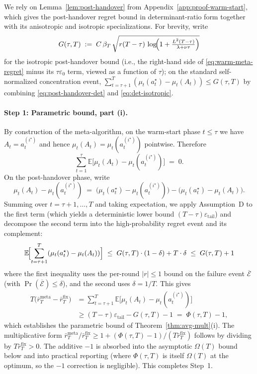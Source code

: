 \documentclass{article}
\theoremstyle{definition}
\theoremstyle{remark}
\newcommand{\meta}{\mathrm{meta}}
\newcommand{\fix}{\mathrm{fix}}
\theoremstyle{remark}
\begin{document}
We rely on Lemma~\ref{lem:post-handover} from
Appendix~\ref{app:proof-warm-start}, which gives the post-handover regret
bound in determinant-ratio form together with its anisotropic and
isotropic specializations. For brevity, write
\[
G(\tau,T)
\;:=\;
C\,\beta_T\,
\sqrt{
r(T-\tau)\,
\log\!\Bigl(1+\tfrac{L^2(T-\tau)}{\lambda+\nu\tau}\Bigr)
}
\]
for the isotropic post-handover bound (i.e., the right-hand side of
\eqref{eq:warm-meta-regret} minus its $\tau\varepsilon_0$ term, viewed as
a function of $\tau$); on the standard self-normalized concentration
event,
$\sum_{t=\tau+1}^T(\mu_t(a_t^\star)-\mu_t(A_t))\le G(\tau,T)$ by
combining \eqref{eq:post-handover-det} and \eqref{eq:det-isotropic}.

\paragraph{Step 1: Parametric bound, part (i).}
By construction of the meta-algorithm, on the warm-start phase $t\le\tau$
we have $A_t = a_t^{(i^\star)}$ and hence
$\mu_t(A_t)=\mu_t(a_t^{(i^\star)})$ pointwise. Therefore
\[
\sum_{t=1}^{\tau}\mathbb E\bigl[\mu_t(A_t)-\mu_t(a_t^{(i^\star)})\bigr]
\;=\;0.
\]
On the post-handover phase, write
\[
\mu_t(A_t)-\mu_t(a_t^{(i^\star)})
\;=\;
\bigl(\mu_t(a_t^\star)-\mu_t(a_t^{(i^\star)})\bigr)
-\bigl(\mu_t(a_t^\star)-\mu_t(A_t)\bigr).
\]
Summing over $t=\tau+1,\dots,T$ and taking expectation, we apply
Assumption~D to the first term (which yields a deterministic lower
bound $(T-\tau)\varepsilon_{\mathrm{tail}}$) and decompose the second
term into the high-probability regret event and its complement:
\[
\mathbb E\!\Bigl[\sum_{t=\tau+1}^T (\mu_t(a_t^\star)-\mu_t(A_t))\Bigr]
\;\le\; G(\tau,T)\cdot(1-\delta) + T\cdot\delta
\;\le\; G(\tau,T) + 1
\]
where the first inequality uses the per-round $|r| \le 1$ bound on the
failure event $\overline{\mathcal E}$ (with $\Pr(\overline{\mathcal E})
\le \delta$), and the second uses $\delta = 1/T$. This gives
\begin{align*}
T\bigl(\bar r_T^{\meta}-\bar r_T^{\fix}\bigr)
&=\sum_{t=\tau+1}^T \mathbb E\bigl[\mu_t(A_t)-\mu_t(a_t^{(i^\star)})\bigr]
\\&\ge (T-\tau)\varepsilon_{\mathrm{tail}}-G(\tau,T)-1
\;=\;\Phi(\tau,T) - 1,
\end{align*}
which establishes the parametric bound of
Theorem~\ref{thm:avg-mult}(i). The multiplicative form
$\bar r_T^{\meta}/\bar r_T^{\fix}\ge 1+(\Phi(\tau,T)-1)/(T\bar r_T^{\fix})$
follows by dividing by $T\bar r_T^{\fix}>0$. The additive $-1$ is
absorbed into the asymptotic $\Omega(T)$ bound below and into
practical reporting (where $\Phi(\tau,T)$ is itself $\Omega(T)$ at the
optimum, so the $-1$ correction is negligible).
This completes Step~1.
\end{document}
